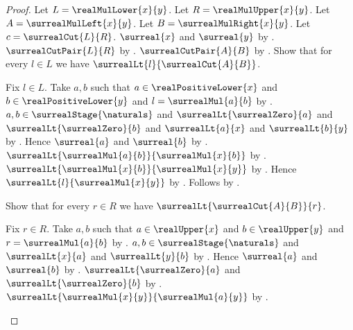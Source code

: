 \begin{proof}
    Let $L=\realMulLower{x}{y}$.
    Let $R=\realMulUpper{x}{y}$.
    Let $A=\surrealMulLeft{x}{y}$.
    Let $B=\surrealMulRight{x}{y}$.
    Let $c=\surrealCut{L}{R}$.
    $\surreal{x}$ and $\surreal{y}$
        by .
    $\surrealCutPair{L}{R}$
        by .
    $\surrealCutPair{A}{B}$
        by .
    Show that for every $l\in L$ we have
        $\surrealLt{l}{\surrealCut{A}{B}}$.
    \begin{subproof}
        Fix $l\in L$.
        Take $a,b$ such that
            $a\in\realPositiveLower{x}$ and
            $b\in\realPositiveLower{y}$ and
            $l=\surrealMul{a}{b}$
            by .
        $a,b\in\surrealStage{\naturals}$ and
            $\surrealLt{\surrealZero}{a}$ and
            $\surrealLt{\surrealZero}{b}$ and
            $\surrealLt{a}{x}$ and $\surrealLt{b}{y}$
            by .
        Hence $\surreal{a}$ and $\surreal{b}$
            by
            .
        $\surrealLt{\surrealMul{a}{b}}{\surrealMul{x}{b}}$
            by .
        $\surrealLt{\surrealMul{x}{b}}{\surrealMul{x}{y}}$
            by
            .
        Hence $\surrealLt{l}{\surrealMul{x}{y}}$
            by
            .
        Follows by .
    \end{subproof}
    Show that for every $r\in R$ we have
        $\surrealLt{\surrealCut{A}{B}}{r}$.
    \begin{subproof}
        Fix $r\in R$.
        Take $a,b$ such that
            $a\in\realUpper{x}$ and $b\in\realUpper{y}$ and
            $r=\surrealMul{a}{b}$
            by .
        $a,b\in\surrealStage{\naturals}$ and
            $\surrealLt{x}{a}$ and $\surrealLt{y}{b}$
            by .
        Hence $\surreal{a}$ and $\surreal{b}$
            by
            .
        $\surrealLt{\surrealZero}{a}$ and
            $\surrealLt{\surrealZero}{b}$
            by
            .
        $\surrealLt{\surrealMul{x}{y}}{\surrealMul{a}{y}}$
            by
            .

\end{subproof}
\end{proof}
